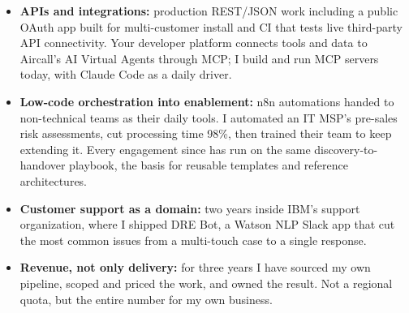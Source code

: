 \documentclass[]{cover}
\begin{document}


\currentdate{\today}




{\raggedright{}\fontsize{11pt}{13pt}\selectfont
\begin{itemize}
    \item \textbf{APIs and integrations:} production REST/JSON work including a public OAuth app built for multi-customer install and CI that tests live third-party API connectivity. Your developer platform connects tools and data to Aircall's AI Virtual Agents through MCP; I build and run MCP servers today, with Claude Code as a daily driver.
    \item \textbf{Low-code orchestration into enablement:} n8n automations handed to non-technical teams as their daily tools. I automated an IT MSP's pre-sales risk assessments, cut processing time 98\%, then trained their team to keep extending it. Every engagement since has run on the same discovery-to-handover playbook, the basis for reusable templates and reference architectures.
    \item \textbf{Customer support as a domain:} two years inside IBM's support organization, where I shipped DRE Bot, a Watson NLP Slack app that cut the most common issues from a multi-touch case to a single response.
    \item \textbf{Revenue, not only delivery:} for three years I have sourced my own pipeline, scoped and priced the work, and owned the result. Not a regional quota, but the entire number for my own business.
\end{itemize}\par}
\vspace{2pt}
\end{document}
